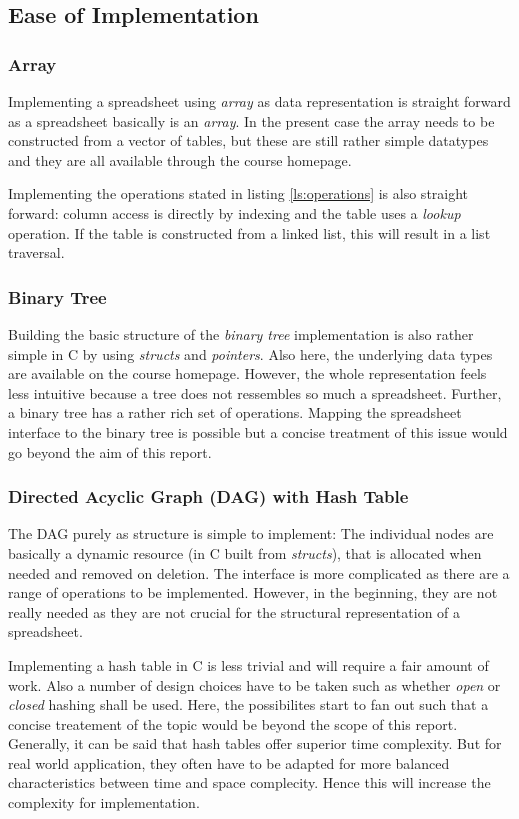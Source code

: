 \documentclass[a4paper,11pt,twoside]{article}
\begin{document}
\subsection{Ease of Implementation}
\subsubsection{Array}
Implementing a spreadsheet using \textit{array} as data representation
is straight forward as a spreadsheet basically is an \textit{array}. In the
present case the array needs to be constructed from a vector of
tables, but these are still rather simple datatypes and they are all
available through the course homepage.

Implementing the operations stated in listing \ref{ls:operations}
is also straight forward: column access is directly by indexing and
the table uses a \textit{lookup} operation. If the table is
constructed from a linked list, this will result in a list traversal. 


\subsubsection{Binary Tree}
Building the basic structure of the \textit{binary tree}
implementation is also rather simple in C by using \textit{structs}
and \textit{pointers}. Also here, the underlying data
types are available on the course homepage. However, the whole
representation feels less intuitive because a tree does not ressembles
so much a spreadsheet. Further, a binary tree has a rather rich set of 
operations. Mapping the spreadsheet interface to the binary tree is
possible but a concise treatment of this issue would go beyond the aim
of this report.


\subsubsection{Directed Acyclic Graph (DAG) with Hash Table}
The DAG purely as structure is simple to implement: The individual
nodes are basically a dynamic resource (in C built from
\textit{structs}),  that is allocated when needed and removed on
deletion. The interface is more complicated as there are a range of
operations to be implemented. However, in the beginning, they are not
really needed as they are not crucial for the structural
representation of a spreadsheet. 

Implementing a hash table in C is less trivial and will require a fair
amount of work. Also a number of design choices have to be taken such
as whether \textit{open} or \textit{closed} hashing shall be
used. Here, the possibilites start to fan out such that a concise
treatement of the topic would be beyond the scope of this
report. Generally, it can be said that hash tables offer superior time
complexity. But for real world application, they often have to be
adapted for more balanced characteristics between time and space
complecity. Hence this will increase the complexity for implementation.
\end{document}
